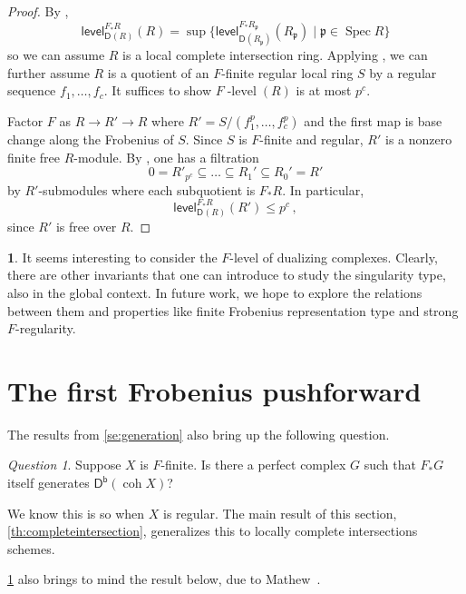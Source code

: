 \documentclass{amsart}
\newcommand{\dcat}[2][]{\cat{D}_{#1}(#2)}
\newcommand{\coh}{\operatorname{coh}}
\newcommand{\dbcat}[1]{\cat{D}^{\mathsf{b}}(#1)}
\newcommand{\fp}{\mathfrak{p}}
\newcommand{\cat}[1]{{\mathsf{#1}}}
\newcommand{\flevel}{F\!\operatorname{-level}}
\newcommand{\level}{\mathsf{level}}
\newcommand{\spec}{\operatorname{Spec}}
\newcounter{intro}
\theoremstyle{definition}
\newtheorem{chunk}[subsection]{}
\theoremstyle{remark}
\newtheorem{question}[subsection]{Question}
\numberwithin{equation}{subsection}
\begin{document}
\begin{proof}
 By \cite[Corollary~3.4]{Letz:2021}, 
 \[
 \level^{F_*R}_{\dcat R}(R)=\sup\{\level^{F_*R_\fp}_{\dcat {R_\fp}}(R_\fp)\mid \fp\in \spec R\}
 \]
 so we can assume $R$ is a local complete intersection ring. Applying \cite[Corollary~2.12]{Letz:2021}, we can further assume $R$ is a quotient of an $F$-finite regular local ring $S$ by a regular sequence $f_1,\ldots,f_c$. It suffices to show $\flevel(R)$ is at most $p^c.$ 
 
Factor $F$ as $R\to R'\to R$
where $R'=S/(f_1^p,\ldots, f_c^p)$ and the first map is base change along the Frobenius of $S$. Since $S$ is $F$-finite and regular, $R'$  is a nonzero finite free $R$-module. By \cite[Remark~2]{Avramov/Miller:2001}, one has a filtration
\[
0=R'_{p^c}\subseteq \ldots \subseteq R_1'\subseteq R_0'=R'
\]
by $R'$-submodules where each subquotient is $F_*R$. In particular, 
\[
\level^{F_*R}_{\dcat R}(R')\le p^c\,,
\]
since $R'$ is free over $R$.
\end{proof}

\begin{chunk}
It seems interesting to consider the $F$-level of dualizing complexes.
 Clearly, there are other invariants that one can introduce to study the singularity type, also in the global context. In future work, we hope to explore the relations between them and properties like finite Frobenius representation type and strong $F$-regularity.
\end{chunk}

\section{The first Frobenius pushforward}
\label{se:firstpushforward}

The results from \cref{se:generation} also bring up the following question.

\begin{question}
\label{qu:first-push-forward}
Suppose $X$ is $F$-finite. Is there a perfect complex $G$ such that $F_*G$ itself generates $\dbcat {\coh X}$? 
\end{question}

We know this is so when $X$ is regular. The main result of this section, \cref{th:completeintersection}, generalizes this to locally complete intersections schemes.

 \cref{qu:first-push-forward} also brings to mind the result below, due to Mathew~\cite{Mathew:2018}. 
\end{document}
